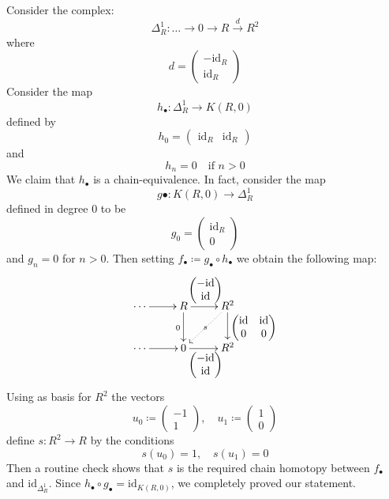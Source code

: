 \begin{refsection}
\begin{eg} \label{eg delta^1 for chain complexes}
Consider the complex:
\[
\Delta^1_R \colon \ldots \to 0 \to R \xrightarrow{d} R^2
\]
where
\[
d = \begin{pmatrix} - \mathrm{id}_R \\ \mathrm{id}_R \end{pmatrix}
\]
Consider the map
\[
h_\bullet \colon \Delta^1_R \to K(R,0)
\]
defined by
\[
h_0 = \begin{pmatrix} \mathrm{id}_R & \mathrm{id}_R \end{pmatrix}
\]
and
\[
h_n = 0 \quad \text{if } n > 0
\]
We claim that $h_\bullet$ is a chain-equivalence. In fact, consider the map
\[
g \bullet \colon K(R,0) \to \Delta^1_R
\]
defined in degree $0$ to be
\[
g_0 = \begin{pmatrix} \mathrm{id}_R \\ 0 \end{pmatrix}
\]
and $g_n = 0$ for $n > 0$. Then setting $f_\bullet\coloneqq g_\bullet \circ h_\bullet$ we obtain the following map:
\[
\xymatrix{
\cdots \ar[r] & R \ar[d]_0 \ar[r]^{\scriptstyle \begin{pmatrix} - \mathrm{id} \\ \mathrm{id} \end{pmatrix}} & R^2 \ar[d]^{\scriptstyle \begin{pmatrix} \mathrm{id} & \mathrm{id} \\ 0 & 0 \end{pmatrix}} \ar@{.>}[dl]|-s \\ \cdots \ar[r] & 0 \ar[r]_{\scriptstyle \begin{pmatrix} - \mathrm{id} \\ \mathrm{id} \end{pmatrix}} & R^2
}
\]
Using as basis for $R^2$ the vectors
\[
u_0\coloneqq \begin{pmatrix}
-1 \\ 1
\end{pmatrix}, \quad u_1\coloneqq \begin{pmatrix} 1 \\ 0 \end{pmatrix}
\]
define $s \colon R^2 \to R$ by the conditions
\[
s(u_0) = 1, \quad s(u_1) = 0
\]
Then a routine check shows that $s$ is the required chain homotopy between $f_\bullet$ and $\mathrm{id}_{\Delta^1_R}$. Since $h_\bullet \circ g_\bullet = \mathrm{id}_{K(R,0)}$, we completely proved our statement.
\end{eg}



\end{refsection}
